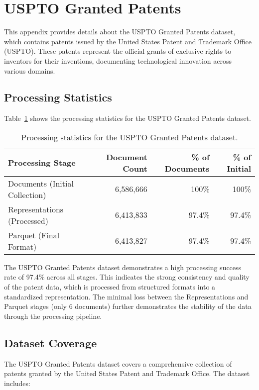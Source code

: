 \section{USPTO Granted Patents}
\label{appendix:uspto}

This appendix provides details about the USPTO Granted Patents dataset, which contains patents issued by the United States Patent and Trademark Office (USPTO). These patents represent the official grants of exclusive rights to inventors for their inventions, documenting technological innovation across various domains.

\subsection{Processing Statistics}

Table~\ref{table:uspto-stats} shows the processing statistics for the USPTO Granted Patents dataset.

\begin{table}[h]
\centering
\begin{tabular}{|l|r|r|r|}
\hline
\textbf{Processing Stage} & \textbf{Document Count} & \textbf{\% of Documents} & \textbf{\% of Initial} \\
\hline
Documents (Initial Collection) & 6,586,666 & 100\% & 100\% \\
Representations (Processed) & 6,413,833 & 97.4\% & 97.4\% \\
Parquet (Final Format) & 6,413,827 & 97.4\% & 97.4\% \\
\hline
\end{tabular}
\caption{Processing statistics for the USPTO Granted Patents dataset.}
\label{table:uspto-stats}
\end{table}

The USPTO Granted Patents dataset demonstrates a high processing success rate of 97.4\% across all stages. This indicates the strong consistency and quality of the patent data, which is processed from structured formats into a standardized representation. The minimal loss between the Representations and Parquet stages (only 6 documents) further demonstrates the stability of the data through the processing pipeline.

\subsection{Dataset Coverage}

The USPTO Granted Patents dataset covers a comprehensive collection of patents granted by the United States Patent and Trademark Office. The dataset includes:

